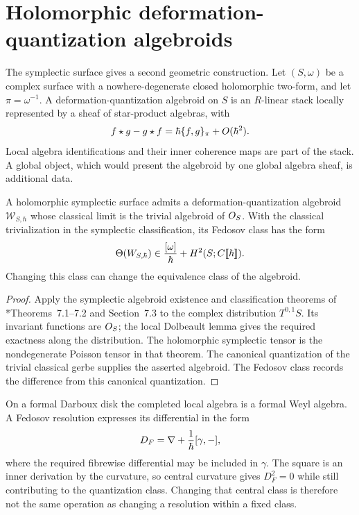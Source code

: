 \section{Holomorphic deformation-quantization algebroids}
The symplectic surface gives a second geometric construction.
Let $(S,\omega)$ be a complex surface with a nowhere-degenerate closed
holomorphic two-form, and let $\pi=\omega^{-1}$.
A deformation-quantization algebroid on $S$ is an $R$-linear stack
locally represented by a sheaf of star-product algebras, with
\[
 f\star g-g\star f=\hbar\{f,g\}_\pi+O(\hbar^2).
\]
Local algebra identifications and their inner coherence maps are part
of the stack.  A global object, which would present the algebroid by
one global algebra sheaf, is additional data.

\begin{theorem}
A holomorphic symplectic surface admits a deformation-quantization
algebroid $\mathcal W_{S,\hbar}$ whose classical limit is the trivial
algebroid of $O_S$.  With the classical trivialization in the
symplectic classification, its Fedosov class has the form
\[
 \Theta(W_{S,\hbar})
 \in\frac{[\omega]}{\hbar}
       +H^2(S;C\llbracket\hbar\rrbracket).
\]
Changing this class can change the equivalence class of the algebroid.
\end{theorem}
\begin{proof}
Apply the symplectic algebroid existence and classification theorems
of \cite{BresslerRojasDQ}*{Theorems~7.1--7.2 and Section~7.3}
to the complex distribution $T^{0,1}S$.
Its invariant functions are $O_S$; the local Dolbeault lemma gives
the required exactness along the distribution.  The holomorphic
symplectic tensor is the nondegenerate Poisson tensor in that theorem.
The canonical quantization of the trivial classical gerbe supplies
the asserted algebroid.  The Fedosov class records the difference
from this canonical quantization.
\end{proof}

On a formal Darboux disk the completed local algebra is a formal Weyl algebra.
A Fedosov resolution expresses its differential in the form
\[
 D_F=\nabla+\frac1{\hbar}[\gamma,-],
\]
where the required fibrewise differential may be included in $\gamma$.
The square is an inner derivation by the curvature, so central
curvature gives $D_F^2=0$ while still contributing to the
quantization class.  Changing that central class
is therefore not the same operation as changing a resolution within
a fixed class.

